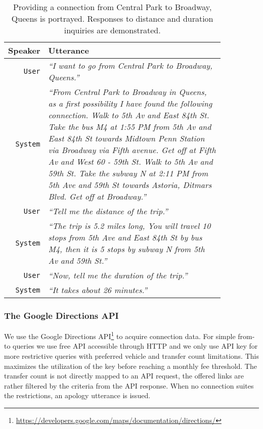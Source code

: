 \begin{table}[h]
\centering
\begin{tabular}{ | r | p{0.85\linewidth} | } \hline
	\textbf{Speaker} & \textbf{Utterance} \\ \hline
	\texttt{User} & \textit{``I want to go from Central Park to Broadway, Queens.''} \\ \hline
	\texttt{System} & \textit{``From Central Park to Broadway in Queens, as a first possibility
	I have found the following connection.
	Walk to 5th Av and East 84th St. 
	Take the bus M4 at 1:55 PM from 5th Av and East 84th St towards Midtown Penn Station via Broadway via Fifth avenue.
	Get off at Fifth Av and West 60 - 59th St. Walk to 5th Av and 59th St.
	Take the subway N at 2:11 PM from 5th Ave and 59th St towards Astoria, Ditmars Blvd. 
	Get off at Broadway.''} \\ \hline
	\texttt{User} & \textit{``Tell me the distance of the trip.''} \\ \hline
	\texttt{System} & \textit{``The trip is 5.2 miles long, You will travel 10 stops from 5th Ave and East 84th St by bus M4, then it is 5 stops by subway N from 5th Av and 59th St.''} \\ \hline
	\texttt{User} & \textit{``Now, tell me the duration of the trip.''} \\ \hline
	\texttt{System} & \textit{``It takes about 26 minutes.''} \\ \hline
\end{tabular}
\caption[Particular connection with distance and duration inquiries]{Providing a connection from Central Park to Broadway, Queens is portrayed. Responses to distance and duration inquiries are demonstrated.}
\label{table:distance}
\end{table}

\subsubsection{The Google Directions \ac{API}}

We use the Google Directions \ac{API}\footnote{\url{https://developers.google.com/maps/documentation/directions/}} to acquire connection data.
For simple from-to queries we use free \ac{API} accessible through HTTP and we only use \ac{API} key for more restrictive queries with preferred vehicle and transfer count limitations.
This maximizes the utilization of the key before reaching a monthly fee threshold.
The transfer count is not directly mapped to an \ac{API} request, the offered links are rather filtered by the criteria from the \ac{API} response.
When no connection suites the restrictions, an apology utterance is issued.

